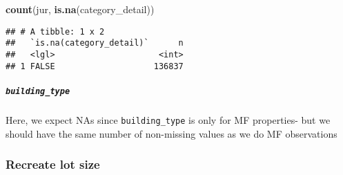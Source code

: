\documentclass[]{article}
\newenvironment{Shaded}{\begin{snugshade}}{\end{snugshade}}
\newcommand{\KeywordTok}[1]{\textcolor[rgb]{0.13,0.29,0.53}{\textbf{#1}}}
\newcommand{\StringTok}[1]{\textcolor[rgb]{0.31,0.60,0.02}{#1}}
\newcommand{\OtherTok}[1]{\textcolor[rgb]{0.56,0.35,0.01}{#1}}
\newcommand{\ControlFlowTok}[1]{\textcolor[rgb]{0.13,0.29,0.53}{\textbf{#1}}}
\newcommand{\OperatorTok}[1]{\textcolor[rgb]{0.81,0.36,0.00}{\textbf{#1}}}
\newcommand{\NormalTok}[1]{#1}
\let\oldsubparagraph\subparagraph
\renewcommand{\subparagraph}[1]{\oldsubparagraph{#1}\mbox{}}
\begin{document}
\begin{Shaded}
\begin{Highlighting}[]
\KeywordTok{count}\NormalTok{(jur, }\KeywordTok{is.na}\NormalTok{(category_detail))}
\end{Highlighting}
\end{Shaded}

\begin{verbatim}
## # A tibble: 1 x 2
##   `is.na(category_detail)`      n
##   <lgl>                     <int>
## 1 FALSE                    136837
\end{verbatim}

\begin{Shaded}
\end{Shaded}

\subparagraph{\texorpdfstring{\texttt{building\_type}}{building\_type}}\label{building_type-1}

Here, we expect NAs since \texttt{building\_type} is only for MF
properties- but we should have the same number of non-missing values as
we do MF observations

\begin{Shaded}
\end{Shaded}

\subsubsection{Recreate lot size}\label{recreate-lot-size}
\end{document}
